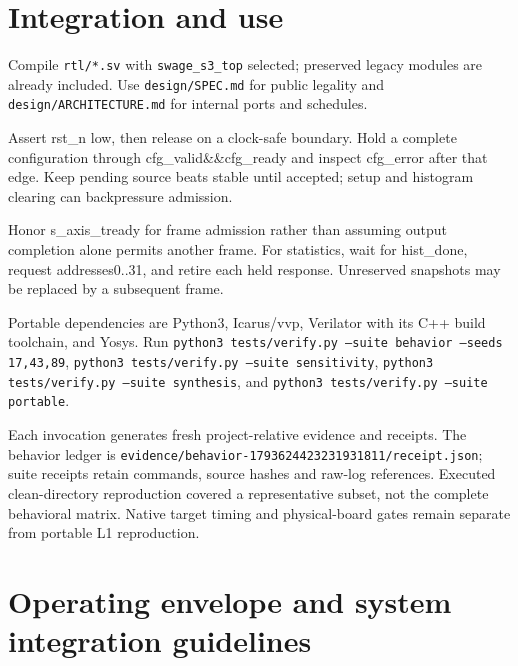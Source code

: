 \documentclass[11pt,a4paper]{article}
\begin{document}
\section{Integration and use}

Compile \texttt{rtl/\allowbreak{}*\allowbreak{}.sv} with \texttt{swage\_\allowbreak{}s3\_\allowbreak{}top} selected; preserved legacy modules are already included. Use \texttt{design/\allowbreak{}SPEC.md} for public legality and \texttt{design/\allowbreak{}ARCHITECTURE.md} for internal ports and schedules.


Assert rst\_\allowbreak{}n low,\allowbreak{} then release on a clock-safe boundary. Hold a complete configuration through cfg\_\allowbreak{}valid\&\&cfg\_\allowbreak{}ready and inspect cfg\_\allowbreak{}error after that edge. Keep pending source beats stable until accepted; setup and histogram clearing can backpressure admission.


Honor s\_\allowbreak{}axis\_\allowbreak{}tready for frame admission rather than assuming output completion alone permits another frame. For statistics,\allowbreak{} wait for hist\_\allowbreak{}done,\allowbreak{} request addresses0..31,\allowbreak{} and retire each held response. Unreserved snapshots may be replaced by a subsequent frame.


Portable dependencies are Python3,\allowbreak{} Icarus/\allowbreak{}vvp,\allowbreak{} Verilator with its C+\allowbreak{}+\allowbreak{} build toolchain,\allowbreak{} and Yosys. Run \texttt{python3 tests/\allowbreak{}verify.py --suite behavior --seeds 17,\allowbreak{}43,\allowbreak{}89},\allowbreak{} \texttt{python3 tests/\allowbreak{}verify.py --suite sensitivity},\allowbreak{} \texttt{python3 tests/\allowbreak{}verify.py --suite synthesis},\allowbreak{} and \texttt{python3 tests/\allowbreak{}verify.py --suite portable}.


Each invocation generates fresh project-relative evidence and receipts. The behavior ledger is \texttt{evidence/\allowbreak{}behavior-1793624423231931811/\allowbreak{}receipt.json}; suite receipts retain commands,\allowbreak{} source hashes and raw-log references. Executed clean-directory reproduction covered a representative subset,\allowbreak{} not the complete behavioral matrix. Native target timing and physical-board gates remain separate from portable L1 reproduction.


\section{Operating envelope and system integration guidelines}
\end{document}
